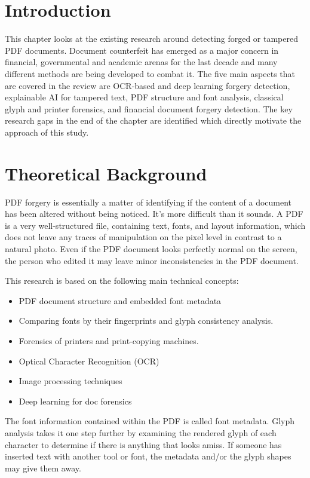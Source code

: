\section{Introduction}

This chapter looks at the existing research around detecting forged or tampered PDF documents. Document counterfeit has emerged as a major concern in financial, governmental and academic arenas for the last decade and many different methods are being developed to combat it. The five main aspects that are covered in the review are OCR-based and deep learning forgery detection, explainable AI for tampered text, PDF structure and font analysis, classical glyph and printer forensics, and financial document forgery detection. The key research gaps in the end of the chapter are identified which directly motivate the approach of this study.

\section{Theoretical Background}

PDF forgery is essentially a matter of identifying if the content of a document has been altered without being noticed. It's more difficult than it sounds. A PDF is a very well-structured file, containing text, fonts, and layout information, which does not leave any traces of manipulation on the pixel level in contrast to a natural photo. Even if the PDF document looks perfectly normal on the screen, the person who edited it may leave minor inconsistencies in the PDF document.

This research is based on the following main technical concepts:

\begin{itemize}
    \item PDF document structure and embedded font metadata
    \item  Comparing fonts by their fingerprints and glyph consistency analysis.
    \item Forensics of printers and print-copying machines.
    \item Optical Character Recognition (OCR)
    \item Image processing techniques
    \item Deep learning for doc forensics
\end{itemize}

\noindent The font information contained within the PDF is called font metadata. Glyph analysis takes it one step further by examining the rendered glyph of each character to determine if there is anything that looks amiss. If someone has inserted text with another tool or font, the metadata and/or the glyph shapes may give them away.\\

